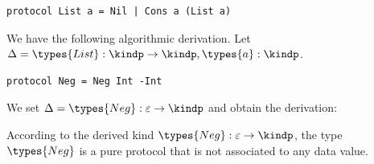 \begin{lstlisting}
protocol List a = Nil | Cons a (List a)
\end{lstlisting}
  We have the following algorithmic derivation. Let $\Delta =
  \types{List} : \kindp \to \kindp, \types{a} : \kindp$.
  \begin{mathpar}
  \end{mathpar}

\begin{lstlisting}
protocol Neg = Neg Int -Int
\end{lstlisting}
  We set $ \Delta = \types{Neg} : \varepsilon \to \kindp$ and obtain the derivation:
  \begin{mathpar}
  \end{mathpar}
  According to the derived kind $\types{Neg} : \varepsilon \to \kindp$, the
  type $\types{Neg}$ is a pure protocol that is not associated to any
  data value.

